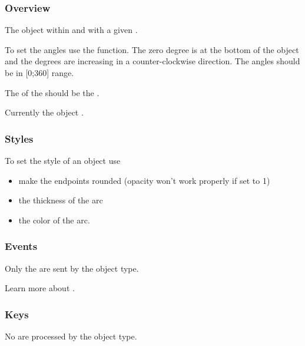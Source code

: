 \documentclass[letterpaper,10pt,english]{sphinxmanual}
\begin{document}
\subsubsection{Overview}
\label{\detokenize{object-types/arc:overview}}
The  object  within  and with a given .

To set the angles use the  function. The zero degree is at the bottom of the object and the degrees are increasing in a counter-clockwise direction.
The angles should be in {[}0;360{]} range.

The  of the  should be the .

Currently the  object .


\subsubsection{Styles}
\label{\detokenize{object-types/arc:styles}}
To set the style of an  object use 
\begin{itemize}
\item {} 
 make the endpoints rounded (opacity won’t work properly if set to 1)

\item {} 
 the thickness of the arc

\item {} 
 the color of the arc.

\end{itemize}


\subsubsection{Events}
\label{\detokenize{object-types/arc:events}}
Only the  are sent by the object type.

Learn more about {\hyperref[\detokenize{overview/events::doc}]{}}.


\subsubsection{Keys}
\label{\detokenize{object-types/arc:keys}}
No  are processed by the object type.
\end{document}
